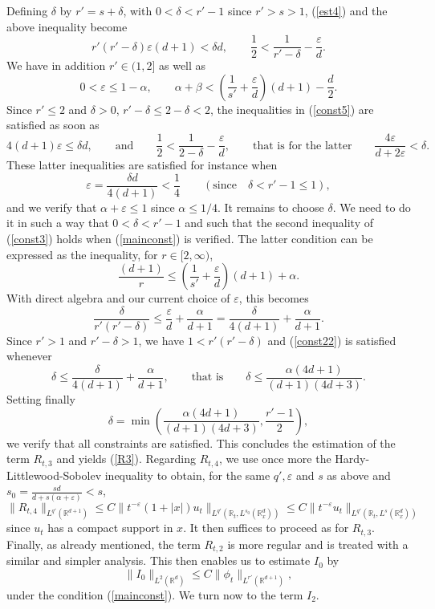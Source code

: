 \documentclass[12pt]{article}
\def \Rm {\mathbb R}
\newcommand{\eps}{\varepsilon}
\def\fref#1{{\rm (\ref{#1})}}
\newcommand{\be}{\begin{equation}}
\newcommand{\ee}{\end{equation}}
\begin{document}
Defining $\delta$ by $r'=s+\delta$, with $0<\delta<r'-1$ since $r'>s>1$, \fref{est4} and the above inequality become
\be \label{const5}
r' (r'-\delta) \eps (d+1)<\delta d, \qquad \frac{1}{2} < \frac{1}{r'-\delta}-\frac{\eps}{d}.
\ee
We have in addition $r'\in (1,2]$ as well as
\be \label{const3} 
0<\eps\leq 1-\alpha, \qquad \alpha+\beta < \left(\frac{1}{s'}+\frac{\eps}{d}\right)(d+1)-\frac{d}{2}.
\ee
Since $r'\leq 2$ and $\delta>0$, $r'-\delta \leq 2-\delta<2$, the inequalities in \fref{const5} are satisfied as soon as
$$
4 (d+1) \eps \leq \delta d, \qquad \textrm{and} \qquad \frac{1}{2} <\frac{1}{2-\delta}-\frac{\eps}{d}, \qquad \textrm{that is for the latter} \qquad \frac{4\eps}{d+2\eps} < \delta.
$$
These latter inequalities are satisfied for instance when 
$$
\eps=\frac{\delta d}{4(d+1)} < \frac{1}{4} \qquad (\textrm{since} \quad\delta <r'-1\leq 1),
$$
and we verify that $\alpha+\eps \leq 1$ since $\alpha \leq 1/4$. It remains to choose $\delta$. We need to do it in such a way that $0<\delta<r'-1$ and such that the second inequality of \fref{const3} holds when \fref{mainconst} is verified. The latter condition can be expressed as the inequality, for $r \in [2,\infty)$,
$$
\frac{(d+1)}{r}\leq \left(\frac{1}{s'}+\frac{\eps}{d}\right)(d+1)+\alpha.
$$
With direct algebra and our current choice of $\eps$, this becomes
\be \label{const22}
\frac{\delta}{r'(r'-\delta)} \leq \frac{\eps}{d}+\frac{\alpha}{d+1}=\frac{\delta }{4(d+1)}+\frac{\alpha}{d+1}.
\ee
Since $r'>1$ and $r'-\delta>1$, we have $1<r'(r'-\delta)$ and \fref{const22} is satisfied whenever
$$
\delta \leq \frac{\delta }{4(d+1)}+\frac{\alpha}{d+1}, \qquad \textrm{that is} \qquad \delta \leq \frac{\alpha (4d+1)}{(d+1)(4d+3)}.
$$
Setting finally
$$
\delta= \min \left( \frac{\alpha (4d+1)}{(d+1)(4d+3)},\frac{r'-1}{2} \right),
$$
we verify that all constraints are satisfied. This concludes the estimation of the term $R_{t,3}$ and yields \fref{R3}. Regarding $R_{t,4}$, we use once more the Hardy-Littlewood-Sobolev inequality to obtain, for the same $q',\eps$ and $s$ as above and $s_0=\frac{sd}{d+s(\alpha+\eps)}<s$,
$$
\|R_{t,4}\|_{L^{q'}(\Rm^{d+1})} \leq  C\| t^{-\eps} (1+|x|) u_t \|_{L^{q'}(\Rm_t,L^{s_0}(\Rm_x^{d}))} \leq C\| t^{-\eps} u_t \|_{L^{q'}(\Rm_t,L^{s}(\Rm_x^{d}))}
$$
since $u_t$ has a compact support in $x$. It then suffices to proceed as for $R_{t,3}$. Finally, as already mentioned, the term $R_{t,2}$ is more regular and is treated with a similar and simpler analysis. This then enables us to estimate $I_0$ by
$$
\|I_0\|_{L^2(\Rm^d)} \leq C \|\phi_t\|_{L^{r'}(\Rm^{d+1})},
$$
under the condition \fref{mainconst}. We turn now to the term $I_2$.
\end{document}
